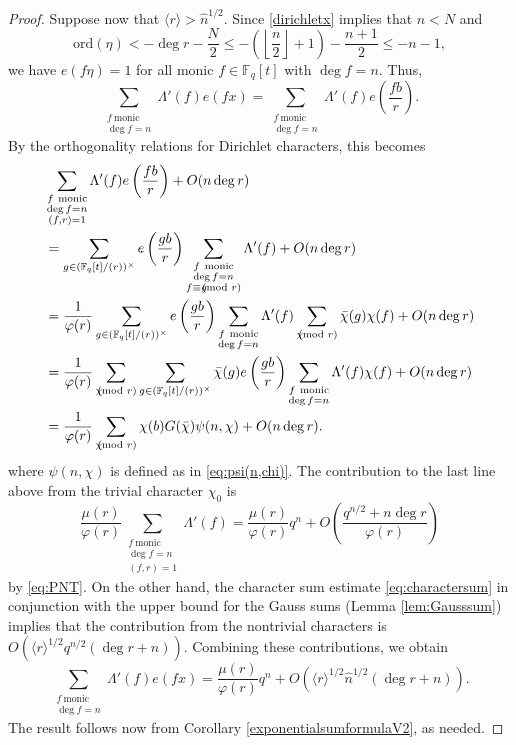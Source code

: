 \documentclass{article}
\theoremstyle{definition}
\theoremstyle{definition}
\theoremstyle{remark}
\newcommand{\F}{\mathbb{F}_q[t]}
\renewcommand\phi\varphi
\newcommand{\1}{\mathbf{1}}
\numberwithin{equation}{section}
\begin{document}
\begin{proof}
Suppose now that $\langle r \rangle >\widehat{n}^{1/2}$. Since \eqref{dirichletx} implies that $n<N$ and
\[\text{ord}(\eta)<-\deg r-\frac{N}{2}\le -\left(\left\lfloor \frac{n}{2}\right\rfloor+1\right)-\frac{n+1}{2}\le -n-1,\] 
we have $e(f\eta)=1$ for all monic $f\in \F$ with $\deg f=n$. Thus, 
\[\sum_{\substack{f~\text{monic}\\\deg f=n}}\Lambda'(f)e(fx)=\sum_{\substack{f~\text{monic}\\\deg f=n}}\Lambda'(f)e\left(\frac{fb}{r}\right).\]
By the orthogonality relations for Dirichlet characters, this becomes 
\begin{align*}
&\sum_{\substack{f~\text{monic}\\\deg f=n\\(f,r)=1}}\Lambda'(f)e\left(\frac{fb}{r}\right)+O(n\deg r)\\
&=\sum_{g\in (\F\slash (r))^\times}e\left(\frac{gb}{r}\right)\sum_{\substack{f~\text{monic}\\\deg f=n\\f\equiv g\hspace*{-2.5mm}\pmod{r}}}\Lambda'(f)+O(n\deg r)\\
&=\frac{1}{\phi(r)}\sum_{g\in (\F\slash (r))^\times}e\left(\frac{gb}{r}\right)\sum_{\substack{f~\text{monic}\\\deg f=n}}\Lambda'(f)\sum_{\chi\hspace*{-2.5mm}\pmod{r}}\bar{\chi}(g)\chi(f)+O(n\deg r)\\
&=\frac{1}{\phi(r)}\sum_{\chi\hspace*{-2.5mm}\pmod{r}}\sum_{g\in (\F\slash (r))^\times}\bar{\chi}(g)e\left(\frac{gb}{r}\right)\sum_{\substack{f~\text{monic}\\\deg f=n}}\Lambda'(f)\chi(f)+O(n\deg r)\\
&=\frac{1}{\phi(r)}\sum_{\chi\hspace*{-2.5mm}\pmod{r}}\chi(b)G(\bar{\chi})\psi(n,\chi)+O(n\deg r).
\end{align*}
where $\psi(n,\chi)$ is defined as in \eqref{eq:psi(n,chi)}. The contribution to the last line above from the trivial character $\chi_0$ is
\[\frac{\mu(r)}{\phi(r)}\sum_{\substack{f~\text{monic}\\\deg f=n\\(f,r)=1}}\Lambda'(f)=\frac{\mu(r)}{\phi(r)}q^n+O\left(\frac{q^{n/2}+n\deg r}{\phi(r)}\right)\]
by \eqref{eq:PNT}. On the other hand, the character sum estimate \eqref{eq:charactersum} in conjunction with the upper bound for the Gauss sums (Lemma \ref{lem:Gausssum}) implies that the contribution from the nontrivial characters is $O(\langle r \rangle ^{1/2}q^{n/2}(\deg r+n))$. Combining these contributions, we obtain
\[\sum_{\substack{f~\text{monic}\\\deg f=n}}\Lambda'(f)e(fx)=\frac{\mu(r)}{\phi(r)}q^n+O\left(\langle r \rangle ^{1\slash 2}\widehat{n}^{1\slash 2}(\deg r+n)\right).\]
The result follows now from Corollary \ref{exponentialsumformulaV2}, as needed. 
\end{proof}
\end{document}
